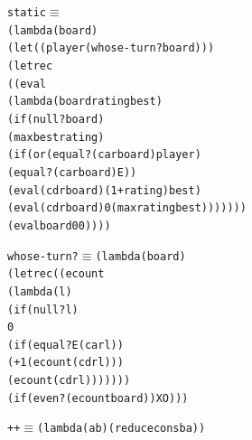 \noindent\begin{minipage}{\linewidth}
\begin{alltt}
static \(\equiv\)
  (lambda (board)
    (let ((player (whose-turn? board)))
      (letrec
        ((eval
          (lambda (board rating best)
            (if (null? board)
                (max best rating)
                (if (or (equal? (car board) player)
                        (equal? (car board) E))
                    (eval (cdr board) (1+ rating) best)
                    (eval (cdr board) 0 (max rating best)))))))
        (eval board 0 0))))
\end{alltt}
\end{minipage}\par\bigskip

\noindent\begin{minipage}{\linewidth}
\begin{alltt}
whose-turn? \(\equiv\) (lambda (board)
                (letrec ((ecount
                          (lambda (l)
                            (if (null? l)
                                0
                                (if (equal? E (car l))
                                    (+ 1 (ecount (cdr l)))
                                    (ecount (cdr l)))))))
                  (if (even? (ecount board)) X O)))
\end{alltt}
\end{minipage}\par\bigskip

\noindent\begin{minipage}{\linewidth}
\begin{alltt}
\texttt{++} \(\equiv\) (lambda (a b) (reduce cons b a))
\end{alltt}
\end{minipage}\par\bigskip

